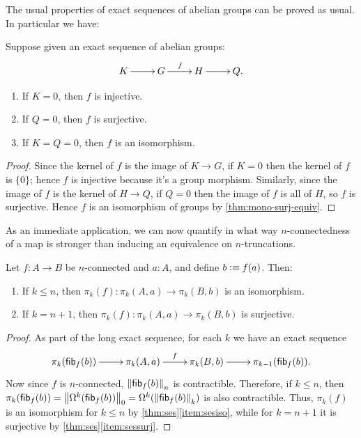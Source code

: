 The usual properties of exact sequences of abelian groups can be proved as
usual. In particular we have:
\begin{lem}\label{thm:ses}
  Suppose given an exact sequence of abelian groups:
  \[\xymatrix{K \ar[r]& G \ar^f[r] & H \ar[r] & Q.}\]
  \begin{enumerate}
  \item If $K=0$, then $f$ is injective.\label{item:sesinj}
  \item If $Q=0$, then $f$ is surjective.\label{item:sessurj}
  \item If $K=Q=0$, then $f$ is an isomorphism.\label{item:sesiso}
  \end{enumerate}
\end{lem}
\begin{proof}
  Since the kernel of $f$ is the image of $K\to G$, if $K=0$ then the kernel of $f$ is $\{0\}$;
  hence $f$ is injective because it's a group morphism.
  Similarly, since the image of $f$ is the kernel of $H\to Q$, if $Q=0$ then the image of $f$ is all of $H$, so $f$ is surjective.
  Hence $f$ is an isomorphism of groups by \autoref{thm:mono-surj-equiv}.
\end{proof}

As an immediate application, we can now quantify in what way $n$-connectedness of a map is stronger than inducing an equivalence on $n$-truncations.

\begin{cor}\label{thm:conn-pik}
  Let $f:A\to B$ be $n$-connected and $a:A$, and define $b\defeq f(a)$.  Then:
  \begin{enumerate}
  \item If $k\le n$, then $\pi_k(f):\pi_k(A,a) \to \pi_k(B,b)$ is an isomorphism.
  \item If $k=n+1$, then $\pi_k(f):\pi_k(A,a) \to \pi_k(B,b)$ is surjective.
  \end{enumerate}
\end{cor}
\begin{proof}
  As part of the long exact sequence, for each $k$ we have an exact sequence
  \[\xymatrix{\pi_k(\hfib f b) \ar[r]& \pi_k(A,a) \ar^f[r] & \pi_k(B,b) \ar[r] & \pi_{k-1}(\hfib f b).}\]
  Now since $f$ is $n$-connected, $\trunc n{\hfib f b}$ is contractible.
  Therefore, if $k\le n$, then $\pi_k(\hfib f b) = \trunc0{\Omega^k(\hfib f b)} = \Omega^k(\trunc k{\hfib f b})$ is also contractible.
  Thus, $\pi_k(f)$ is an isomorphism for $k\le n$ by \autoref{thm:ses}\ref{item:sesiso}, while for $k=n+1$ it is surjective by \autoref{thm:ses}\ref{item:sessurj}.
\end{proof}


